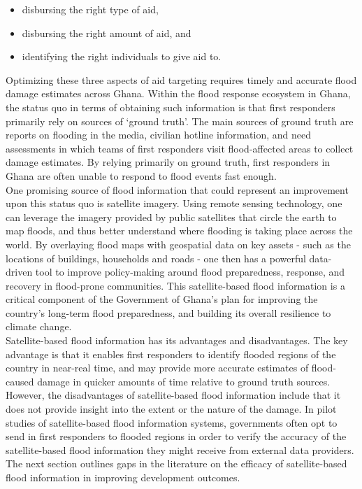 \begin{itemize}
    \item disbursing the right type of aid,
    \item disbursing the right amount of aid, and
    \item identifying the right individuals to give aid to.
\end{itemize}

Optimizing these three aspects of aid targeting requires timely and accurate flood damage estimates across Ghana. Within the flood response ecosystem in Ghana, the status quo in terms of obtaining such information is that first responders primarily rely on sources of ‘ground truth’. The main sources of ground truth are reports on flooding in the media, civilian hotline information, and need assessments in which teams of first responders visit flood-affected areas to collect damage estimates. By relying primarily on ground truth, first responders in Ghana are often unable to respond to flood events fast enough.\\

One promising source of flood information that could represent an improvement upon this status quo is satellite imagery. Using remote sensing technology, one can leverage the imagery provided by public satellites that circle the earth to map floods, and thus better understand where flooding is taking place across the world. By overlaying flood maps with geospatial data on key assets - such as the locations of buildings, households and roads - one then has a powerful data-driven tool to improve policy-making around flood preparedness, response, and recovery in flood-prone communities. This satellite-based flood information is a critical component of the Government of Ghana’s plan for improving the country’s long-term flood preparedness, and building its overall resilience to climate change.\\

Satellite-based flood information has its advantages and disadvantages. The key advantage is that it enables first responders to identify flooded regions of the country in near-real time, and may provide more accurate estimates of flood-caused damage in quicker amounts of time relative to ground truth sources. However, the disadvantages of satellite-based flood information include that it does not provide insight into the extent or the nature of the damage. In pilot studies of satellite-based flood information systems, governments often opt to send in first responders to flooded regions in order to verify the accuracy of the satellite-based flood information they might receive from external data providers.\\

The next section outlines gaps in the  literature on the efficacy of satellite-based flood information in improving development outcomes.
